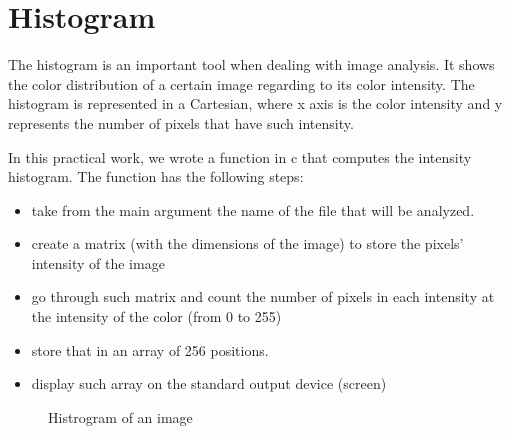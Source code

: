 \documentclass{article}
\begin{document}
\section{Histogram}

	The histogram is an important tool when dealing with image analysis. It shows the color distribution of a certain image regarding to its color intensity. The 		histogram is represented in a Cartesian, where x axis is the color intensity and y represents the number of pixels that have such intensity.

	In this practical work, we wrote a function in c that computes the intensity histogram. The function has the following steps:
	\begin{itemize}
  		\item take from the main argument the name of the file that will be analyzed.
  		\item create a matrix (with the dimensions of the image) to store the pixels' intensity of the image
  		\item go through such matrix and count the number of pixels in each intensity at the intensity of the color (from 0 to 255)
  		\item store that in an array of 256 positions.
  		\item display such array on the standard output device (screen)
	\end{itemize}

	\begin{figure}[H]
	\centering
	\caption{Histrogram of an image}
	\label{fig:equalizing}
	\end{figure}
\end{document}

